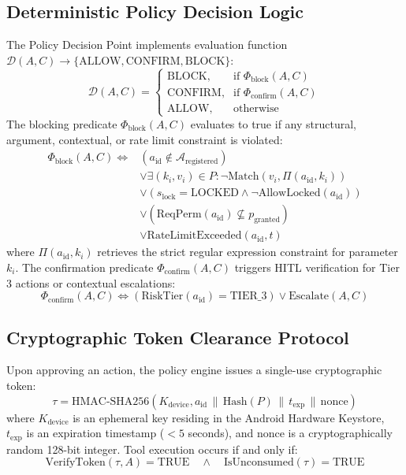 \subsection{Deterministic Policy Decision Logic}
The Policy Decision Point implements evaluation function $\mathcal{D}(A, C) \to \{\text{ALLOW}, \text{CONFIRM}, \text{BLOCK}\}$:
\begin{equation}
\mathcal{D}(A, C) = 
\begin{cases}
\text{BLOCK}, & \text{if } \Phi_{\text{block}}(A, C) \\
\text{CONFIRM}, & \text{if } \Phi_{\text{confirm}}(A, C) \\
\text{ALLOW}, & \text{otherwise}
\end{cases}
\end{equation}
The blocking predicate $\Phi_{\text{block}}(A, C)$ evaluates to true if any structural, argument, contextual, or rate limit constraint is violated:
\begin{align}
\Phi_{\text{block}}(A, C) \iff & (a_{\text{id}} \notin \mathcal{A}_{\text{registered}}) \nonumber \\
& \lor \exists (k_i, v_i) \in P : \neg \text{Match}(v_i, \Pi(a_{\text{id}}, k_i)) \nonumber \\
& \lor (s_{\text{lock}} = \text{LOCKED} \land \neg \text{AllowLocked}(a_{\text{id}})) \nonumber \\
& \lor (\text{ReqPerm}(a_{\text{id}}) \nsubseteq p_{\text{granted}}) \nonumber \\
& \lor \text{RateLimitExceeded}(a_{\text{id}}, t)
\end{align}
where $\Pi(a_{\text{id}}, k_i)$ retrieves the strict regular expression constraint for parameter $k_i$. The confirmation predicate $\Phi_{\text{confirm}}(A, C)$ triggers HITL verification for Tier 3 actions or contextual escalations:
\begin{equation}
\Phi_{\text{confirm}}(A, C) \iff (\text{RiskTier}(a_{\text{id}}) = \text{TIER\_3}) \lor \text{Escalate}(A, C)
\end{equation}

\subsection{Cryptographic Token Clearance Protocol}
Upon approving an action, the policy engine issues a single-use cryptographic token:
\begin{equation}
\tau = \text{HMAC-SHA256}(K_{\text{device}}, a_{\text{id}} \,\|\, \text{Hash}(P) \,\|\, t_{\text{exp}} \,\|\, \text{nonce})
\end{equation}
where $K_{\text{device}}$ is an ephemeral key residing in the Android Hardware Keystore, $t_{\text{exp}}$ is an expiration timestamp ($<5$ seconds), and $\text{nonce}$ is a cryptographically random 128-bit integer. Tool execution occurs if and only if:
\begin{equation}
\text{VerifyToken}(\tau, A) = \text{TRUE} \quad \land \quad \text{IsUnconsumed}(\tau) = \text{TRUE}
\end{equation}

